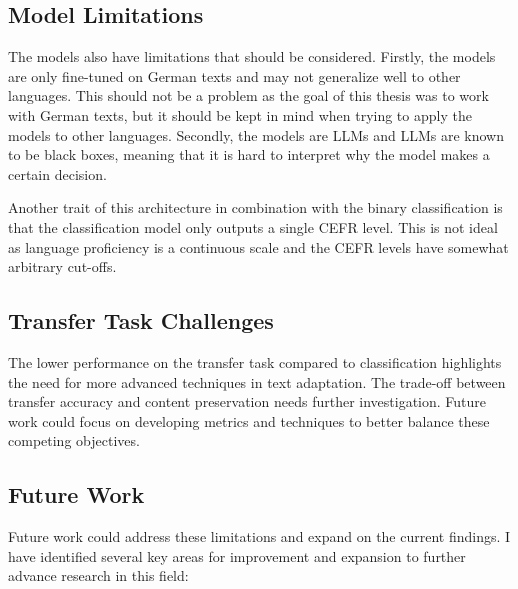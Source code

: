 \subsection{Model Limitations}
\label{ss:model_limitations}
The models also have limitations that should be considered. Firstly, the models are only fine-tuned on German texts and may not generalize well to other languages. This should not be a problem as the goal of this thesis was to work with German texts, but it should be kept in mind when trying to apply the models to other languages. Secondly, the models are LLMs and LLMs are known to be black boxes, meaning that it is hard to interpret why the model makes a certain decision.

Another trait of this architecture in combination with the binary classification is that the classification model only outputs a single CEFR level. This is not ideal as language proficiency is a continuous scale and the CEFR levels have somewhat arbitrary cut-offs.

\subsection{Transfer Task Challenges}
\label{ss:transfer_task_challenges}
The lower performance on the transfer task compared to classification highlights the need for more advanced techniques in text adaptation. The trade-off between transfer accuracy and content preservation needs further investigation. Future work could focus on developing metrics and techniques to better balance these competing objectives.

\subsection{Future Work}
\label{ss:future_work}
Future work could address these limitations and expand on the current findings. I have identified several key areas for improvement and expansion to further advance research in this field:

